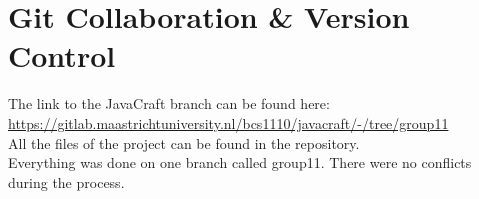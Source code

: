 \section{Git Collaboration \& Version Control} \label{section: git}
The link to the JavaCraft branch can be found here: \href{https://gitlab.maastrichtuniversity.nl/bcs1110/javacraft/-/tree/group11}{https://gitlab.maastrichtuniversity.nl/bcs1110/javacraft/-/tree/group11} \\

All the files of the project can be found in the repository. \\ 
Everything was done on one branch called group11. There were no conflicts during the process.
